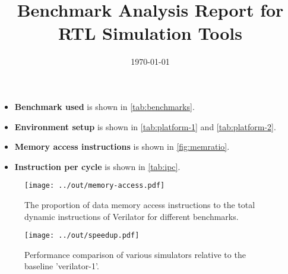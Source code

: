 \documentclass{article}
\title{Benchmark Analysis Report for RTL Simulation Tools}
\date{\today}
\author{}
\begin{document}
\maketitle

\begin{itemize}[noitemsep,topsep=0pt]
  \item {\bf Benchmark used} is shown in \autoref{tab:benchmarks}.
  \item {\bf Environment setup} is shown in \autoref{tab:platform-1} and \autoref{tab:platform-2}.
  \item {\bf Memory access instructions } is shown in \autoref{fig:memratio}.
  \item {\bf Instruction per cycle} is shown in \autoref{tab:ipc}.
\end{itemize}




\centering


\newpage

\begin{figure}[h!]
  \centering
  \texttt{[image: ../out/memory-access.pdf]}
  \vspace*{-4mm}
  \caption{The proportion of data memory access instructions to the total dynamic instructions of Verilator for different benchmarks.}
  \label{fig:memratio}
\end{figure}



\begin{figure}[h!]
  \centering
  \texttt{[image: ../out/speedup.pdf]}
  \vspace*{-4mm}
  \caption{Performance comparison of various simulators relative to the baseline 'verilator-1'.}
\end{figure}
\end{document}
